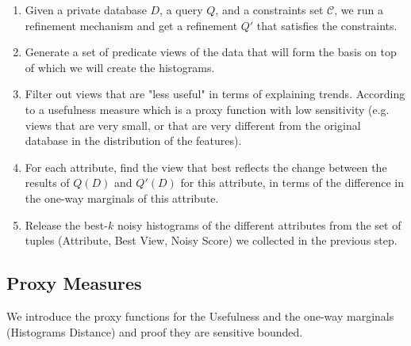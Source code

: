 \begin{enumerate}
    \item Given a private database $D$, a query $Q$, and a constraints set $\mathcal{C}$, we run a refinement mechanism and get a refinement $Q'$ that satisfies the constraints.
    \item Generate a set of predicate views of the data that will form the basis on top of which we will create the histograms.
    \item Filter out views that are "less useful" in terms of explaining trends. According to a usefulness measure which is a proxy function with low sensitivity (e.g. views that are very small, or that are very different from the original database in the distribution of the features). 
    \item For each attribute, find the view that best reflects the change between the results of $Q(D)$ and $Q'(D)$ for this attribute, in terms of the difference in the one-way marginals of this attribute.
    \item Release the best-$k$ noisy histograms of the different attributes from the set of tuples (Attribute, Best View, Noisy Score) we collected in the previous step.
\end{enumerate}

\subsection{Proxy Measures}
We introduce the proxy functions for the Usefulness and the one-way marginals (Histograms Distance) and proof they are sensitive bounded.





